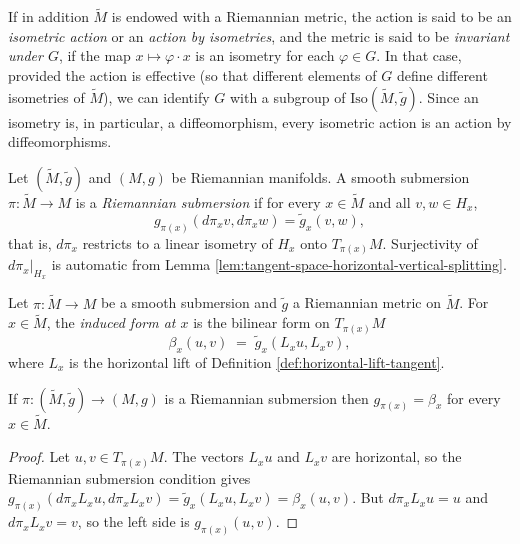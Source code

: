 If in addition $\tilde{M}$ is endowed with a Riemannian metric, the action is said to be an \emph{isometric action} or an \emph{action by isometries}, and the metric is said to be \emph{invariant under $G$}, if the map $x \mapsto \varphi \cdot x$ is an isometry for each $\varphi \in G$. In that case, provided the action is effective (so that different elements of $G$ define different isometries of $\tilde{M}$), we can identify $G$ with a subgroup of $\text{Iso}(\tilde{M}, \tilde{g})$. Since an isometry is, in particular, a diffeomorphism, every isometric action is an action by diffeomorphisms.

\begin{definition}
\label{def:riemannian-submersion}
\leanok
{}
Let $(\tilde{M},\tilde{g})$ and $(M,g)$ be Riemannian manifolds. A smooth submersion $\pi : \tilde{M} \to M$ is a \emph{Riemannian submersion} if for every $x \in \tilde{M}$ and all $v,w \in H_x$,
\[
g_{\pi(x)}(d\pi_x v, d\pi_x w) = \tilde{g}_x(v,w),
\]
that is, $d\pi_x$ restricts to a linear isometry of $H_x$ onto $T_{\pi(x)}M$. Surjectivity of $d\pi_x|_{H_x}$ is automatic from Lemma \ref{lem:tangent-space-horizontal-vertical-splitting}.
\end{definition}

\begin{definition}
\label{def:submersion-inner}
\leanok
{}
Let $\pi : \tilde{M} \to M$ be a smooth submersion and $\tilde{g}$ a Riemannian metric on $\tilde{M}$. For $x \in \tilde{M}$, the \emph{induced form at $x$} is the bilinear form on $T_{\pi(x)}M$
\[
\beta_x(u,v) \;=\; \tilde{g}_x(L_x u, L_x v),
\]
where $L_x$ is the horizontal lift of Definition \ref{def:horizontal-lift-tangent}.
\end{definition}

\begin{lemma}
\label{lem:riemannian-submersion-inner-eq}
\leanok
{}
If $\pi : (\tilde{M},\tilde{g}) \to (M,g)$ is a Riemannian submersion then $g_{\pi(x)} = \beta_x$ for every $x \in \tilde{M}$.
\end{lemma}

\begin{proof}
\leanok
{}
Let $u,v \in T_{\pi(x)}M$. The vectors $L_x u$ and $L_x v$ are horizontal, so the Riemannian submersion condition gives $g_{\pi(x)}(d\pi_x L_x u, d\pi_x L_x v) = \tilde{g}_x(L_x u, L_x v) = \beta_x(u,v)$. But $d\pi_x L_x u = u$ and $d\pi_x L_x v = v$, so the left side is $g_{\pi(x)}(u,v)$.
\end{proof}

